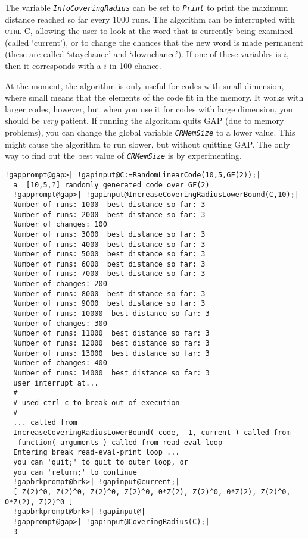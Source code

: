 \documentclass[a4paper,11pt]{report}
\begin{document}
{{{ The variable \mbox{\texttt{\mdseries\slshape InfoCoveringRadius}} can be set to \mbox{\texttt{\mdseries\slshape Print}} to print the maximum distance reached so far every 1000 runs. The algorithm
can be interrupted with \textsc{ctrl-C}, allowing the user to look at the word that is currently being examined
(called `current'), or to change the chances that the new word is made
permanent (these are called `staychance' and `downchance'). If one of these
variables is $i$, then it corresponds with a $i$ in 100 chance. 

 At the moment, the algorithm is only useful for codes with small dimension,
where small means that the elements of the code fit in the memory. It works
with larger codes, however, but when you use it for codes with large
dimension, you should be \emph{very} patient. If running the algorithm quits GAP (due to memory problems), you can
change the global variable \mbox{\texttt{\mdseries\slshape CRMemSize}} to a lower value. This might cause the algorithm to run slower, but without
quitting GAP. The only way to find out the best value of \mbox{\texttt{\mdseries\slshape CRMemSize}} is by experimenting. }

 
\begin{Verbatim}[commandchars=!@|,fontsize=\small,frame=single,label=Example]
  !gapprompt@gap>| !gapinput@C:=RandomLinearCode(10,5,GF(2));|
  a  [10,5,?] randomly generated code over GF(2)
  !gapprompt@gap>| !gapinput@IncreaseCoveringRadiusLowerBound(C,10);|
  Number of runs: 1000  best distance so far: 3
  Number of runs: 2000  best distance so far: 3
  Number of changes: 100
  Number of runs: 3000  best distance so far: 3
  Number of runs: 4000  best distance so far: 3
  Number of runs: 5000  best distance so far: 3
  Number of runs: 6000  best distance so far: 3
  Number of runs: 7000  best distance so far: 3
  Number of changes: 200
  Number of runs: 8000  best distance so far: 3
  Number of runs: 9000  best distance so far: 3
  Number of runs: 10000  best distance so far: 3
  Number of changes: 300
  Number of runs: 11000  best distance so far: 3
  Number of runs: 12000  best distance so far: 3
  Number of runs: 13000  best distance so far: 3
  Number of changes: 400
  Number of runs: 14000  best distance so far: 3
  user interrupt at... 
  #
  # used ctrl-c to break out of execution
  #
  ... called from 
  IncreaseCoveringRadiusLowerBound( code, -1, current ) called from
   function( arguments ) called from read-eval-loop
  Entering break read-eval-print loop ...
  you can 'quit;' to quit to outer loop, or
  you can 'return;' to continue
  !gapbrkprompt@brk>| !gapinput@current;|
  [ Z(2)^0, Z(2)^0, Z(2)^0, Z(2)^0, 0*Z(2), Z(2)^0, 0*Z(2), Z(2)^0, 0*Z(2), Z(2)^0 ]
  !gapbrkprompt@brk>| !gapinput@|
  !gapprompt@gap>| !gapinput@CoveringRadius(C);|
  3
  

\end{Verbatim}}}
\end{document}
